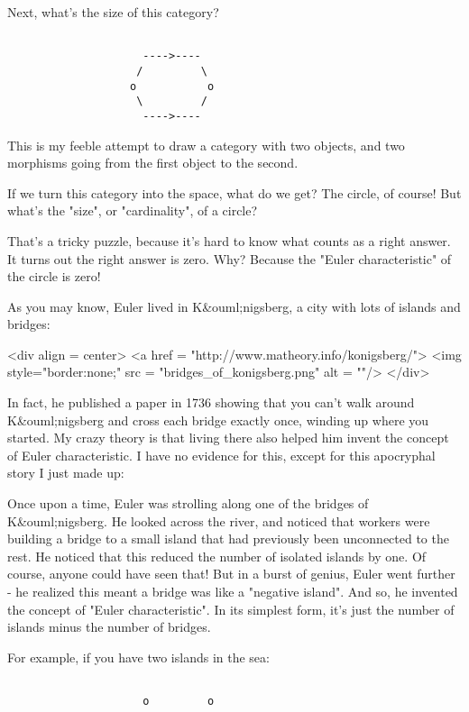 Next, what's the size of this category?


\begin{verbatim}

                     ---->---- 
                    /         \
                   o           o
                    \         /
                     ---->----
\end{verbatim}
    
This is my feeble attempt to draw a category with two objects, and two 
morphisms going from the first object to the second.

If we turn this category into the space, what do we get?  The circle,
of course!  But what's the "size", or
"cardinality", of a circle?

That's a tricky puzzle, because it's hard to know what counts as a
right answer.  It turns out the right answer is zero.  Why?  Because
the "Euler characteristic" of the circle is zero!

As you may know, Euler lived in K&ouml;nigsberg, a city with lots of
islands and bridges:

<div align = center>
<a href = "http://www.matheory.info/konigsberg/">
<img style="border:none;" src = "bridges_of_konigsberg.png" alt = ""/>
</div>

In fact, he published a paper in 1736 showing
that you can't walk around K&ouml;nigsberg and cross each bridge
exactly once, winding up where you started.  
My crazy theory is that
living there also helped him invent the concept of Euler
characteristic.  I have no evidence for this, except for this
apocryphal story I just made up:

Once upon a time, Euler was strolling along one of the bridges of
K&ouml;nigsberg.  He looked across the river, and noticed that workers
were building a bridge to a small island that had previously been
unconnected to the rest.  He noticed that this reduced the number of
isolated islands by one.  Of course, anyone could have seen that!
But in a burst of genius, Euler went further - he realized this meant
a bridge was like a "negative island".  And so, he invented
the concept of "Euler characteristic".  In its simplest
form, it's just the number of islands minus the number of bridges.

For example, if you have two islands in the sea:


\begin{verbatim}

                     o         o
\end{verbatim}
    
